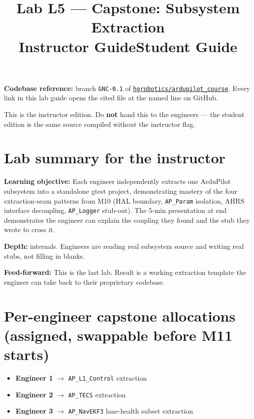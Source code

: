 \documentclass[a4paper,11pt,twoside]{article}
\title{Lab L5 --- Capstone: Subsystem Extraction\\
  \large \ifinstructor Instructor Guide\else Student Guide\fi}
\author{\copyrightline}
\date{}
\begin{document}
\maketitle

\noindent\textbf{Codebase reference:} branch \texttt{GNC-0.1} of \href{\repourl}{\nolinkurl{hgrobotics/ardupilot_course}}. Every link in this lab guide opens the cited file at the named line on GitHub.

\bigskip

\ifinstructor

\begin{tcolorbox}[colback=red!5!white,colframe=red!40!black,title=Instructor edition]
This is the instructor edition. Do \textbf{not} hand this to the engineers --- the student edition is the same source compiled without the instructor flag.
\end{tcolorbox}

\section*{Lab summary for the instructor}

\textbf{Learning objective:} Each engineer independently extracts one ArduPilot subsystem into a standalone gtest project, demonstrating mastery of the four extraction-seam patterns from M10 (HAL boundary, \texttt{AP\_Param} isolation, AHRS interface decoupling, \texttt{AP\_Logger} stub-out). The 5-min presentation at end demonstrates the engineer can explain the coupling they found and the stub they wrote to cross it.

\textbf{Depth:} internals. Engineers are reading real subsystem source and writing real stubs, not filling in blanks.

\textbf{Feed-forward:} This is the last lab. Result is a working extraction template the engineer can take back to their proprietary codebase.

\section*{Per-engineer capstone allocations (assigned, swappable before M11 starts)}

\begin{itemize}
  \item \textbf{Engineer 1} $\rightarrow$ \texttt{AP\_L1\_Control} extraction\\ 
  \item \textbf{Engineer 2} $\rightarrow$ \texttt{AP\_TECS} extraction\\ 
  \item \textbf{Engineer 3} $\rightarrow$ \texttt{AP\_NavEKF3} lane-health subset extraction\\ 
\end{itemize}
\end{document}
